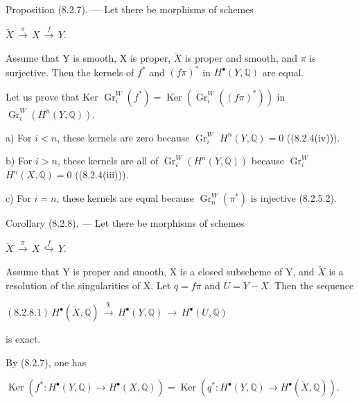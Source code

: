 \documentclass[11pt,twoside]{article}
\newcommand{\DFormula}[1]{%
  \par\smallskip\noindent\hspace*{0pt}\(\displaystyle #1\)\par\smallskip
}
\begin{document}
Proposition (8.2.7). — Let there be morphisms of schemes\par
\par\medskip
\DFormula{\widetilde{X}\,\xrightarrow{\pi }\,X\,\xrightarrow{f}\,Y.}
\par\medskip
Assume that Y is smooth, X is proper, \(\widetilde{X}\) is proper and smooth, and \(\pi \) is surjective. Then the kernels of \(f^{\ast }\) and \((f\pi )^{\ast }\) in \(H^{\bullet }(Y,\mathbb{Q})\) are equal.\par
\par\medskip
Let us prove that Ker \(\operatorname{Gr}_{i}^{W}(f^{\ast })=\operatorname{Ker}(\operatorname{Gr}_{i}^{W}((f\pi )^{\ast }))\) in \(\operatorname{Gr}_{i}^{W}(H^{n}(Y,\mathbb{Q}))\).\par
\par\medskip
a) For \(i<n\), these kernels are zero because \(\operatorname{Gr}_{i}^{W}\) \(H^{n}(Y,\mathbb{Q})=0\) ((8.2.4(iv))).\par
\par\medskip
b) For \(i>n\), these kernels are all of \(\operatorname{Gr}_{i}^{W}(H^{n}(Y,\mathbb{Q}))\) because \(\operatorname{Gr}_{i}^{W}\) \(H^{n}(X,\mathbb{Q})=0\) ((8.2.4(iii))).\par
\par\medskip
c) For \(i=n\), these kernels are equal because \(\operatorname{Gr}_{n}^{W}(\pi ^{\ast })\) is injective (8.2.5.2).\par
\par\medskip
Corollary (8.2.8). — Let there be morphisms of schemes\par
\par\medskip
\DFormula{\widetilde{X}\,\xrightarrow{\pi }\,X\,\overset{f}{\hookrightarrow}\,Y.}
\par\medskip
Assume that Y is proper and smooth, X is a closed subscheme of Y, and \(\widetilde{X}\) is a resolution of the singularities of X. Let \(q=f\pi \) and \(U=Y−X\). Then the sequence\par
\par\medskip
\DFormula{(8.2.8.1)\,H^{\bullet }(\widetilde{X},\mathbb{Q})\,\xrightarrow{q_{!}}\,H^{\bullet }(Y,\mathbb{Q})\,\to \,H^{\bullet }(U,\mathbb{Q})}
\par\medskip
is exact.\par
\par\medskip
By (8.2.7), one has\par
\par\medskip
\DFormula{\operatorname{Ker}(f^{\ast }:H^{\bullet }(Y,\mathbb{Q})\to H^{\bullet }(X,\mathbb{Q}))=\operatorname{Ker}(q^{\ast }:H^{\bullet }(Y,\mathbb{Q})\to H^{\bullet }(\widetilde{X},\mathbb{Q})).}
\end{document}
